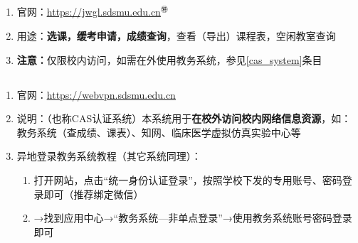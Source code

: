 \subsection[教务系统]{\textbf{}}
\label{academic_affairs_system}
\begin{enumerate}
    \item 官网：\uline{\href{https://jwgl.sdsmu.edu.cn}{https://jwgl.sdsmu.edu.cn}$^㊕$}
    \item 用途：\textbf{选课，缓考申请，成绩查询}，查看（导出）课程表，空闲教室查询
    \item \textbf{注意：}仅限校内访问，如需在外使用教务系统，参见\uline{\ref{cas_system}}条目
\end{enumerate}

\subsection[CAS资源访问控制系统（校内VPN）]{\textbf{}\footnotemark}
\label{cas_system}
\begin{enumerate}
    \item 官网：\uline{\href{https://webvpn.sdsmu.edu.cn}{https://webvpn.sdsmu.edu.cn}}
    \item 说明：（也称CAS认证系统）本系统用于\textbf{在校外访问校内网络信息资源}，如：教务系统（查成绩、课表）、知网、临床医学虚拟仿真实验中心\footnotemark 等
    \item 异地登录教务系统教程（其它系统同理）：
          \begin{enumerate}
              \item 打开网站，点击“统一身份认证登录”，按照学校下发的专用账号、密码登录即可（推荐绑定微信）
              \item →找到应用中心→“教务系统—非单点登录”\footnotemark →使用教务系统账号密码登录即可
          \end{enumerate}
\end{enumerate}

